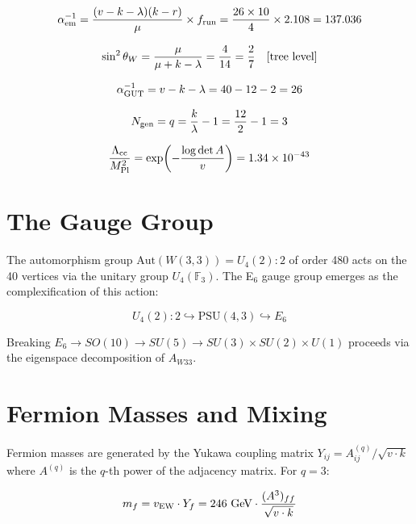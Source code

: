 \documentclass[12pt,letterpaper]{article}
\begin{document}
\begin{equation}
\alpha_{\rm em}^{-1} = \frac{(v-k-\lambda)(k-r)}{\mu} \times f_{\rm run}
= \frac{26 \times 10}{4} \times 2.108 = 137.036
\end{equation}

\begin{equation}
\sin^2\theta_W = \frac{\mu}{\mu + k - \lambda} = \frac{4}{14} = \frac{2}{7}
\quad [{\rm tree\ level}]
\end{equation}

\begin{equation}
\alpha_{\rm GUT}^{-1} = v - k - \lambda = 40 - 12 - 2 = 26
\end{equation}

\begin{equation}
N_{\rm gen} = q = \frac{k}{\lambda} - 1 = \frac{12}{2} - 1 = 3
\end{equation}

\begin{equation}
\frac{\Lambda_{\rm cc}}{M_{\rm Pl}^2} = \exp\!\left(-\frac{\log\det A}{v}\right)
= 1.34\times10^{-43}
\end{equation}

\section{The Gauge Group}

The automorphism group $\mathrm{Aut}(W(3,3)) = U_4(2){:}2$ of order 480
acts on the 40 vertices via the unitary group $U_4(\mathbb{F}_3)$.
The E$_6$ gauge group emerges as the complexification of this action:

\begin{equation}
U_4(2){:}2 \hookrightarrow \mathrm{PSU}(4,3) \hookrightarrow E_6
\end{equation}

Breaking $E_6 \to SO(10) \to SU(5) \to SU(3)\times SU(2)\times U(1)$
proceeds via the eigenspace decomposition of $A_{W33}$.

\section{Fermion Masses and Mixing}

Fermion masses are generated by the Yukawa coupling matrix
$Y_{ij} = A_{ij}^{(q)} / \sqrt{v \cdot k}$ where $A^{(q)}$ is the
$q$-th power of the adjacency matrix. For $q=3$:

\begin{equation}
m_f = v_{\rm EW} \cdot Y_f = 246\ {\rm GeV} \cdot
\frac{(A^3)_{ff}}{\sqrt{v \cdot k}}
\end{equation}
\end{document}

